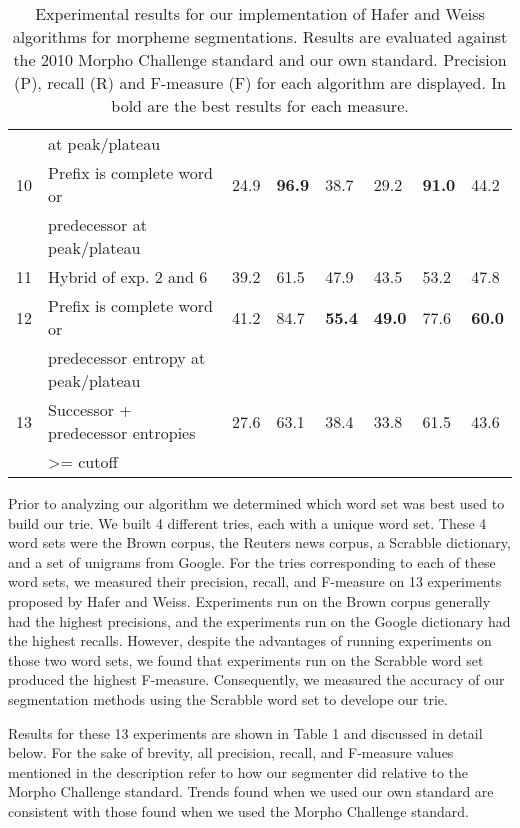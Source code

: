 \documentclass[11pt,letterpaper]{article}
\begin{document}
\begin{table*}[t]
\begin{tabular}{|l|l|l|l|l|l|l|l|}
 & at peak/plateau &  &  &  &  &  &  \\
10 & Prefix is complete word or & 24.9 & \textbf{96.9} & 38.7 & 29.2 & \textbf{91.0} & 44.2 \\
 & predecessor at peak/plateau &  &  &  &  &  &  \\
11 & Hybrid of exp. 2 and 6 & 39.2 & 61.5 & 47.9 & 43.5 & 53.2 & 47.8 \\
12 & Prefix is complete word or & 41.2 & 84.7 & \textbf{55.4} & \textbf{49.0} & 77.6 & \textbf{60.0} \\
 & predecessor entropy at peak/plateau &  &  &  &  &  &  \\
13 & Successor + predecessor entropies & 27.6 & 63.1 & 38.4 & 33.8 & 61.5 & 43.6 \\
 & \textgreater= cutoff &  &  &  &  &  &  \\ \hline
\end{tabular}
\caption{\label{tab:widgets}Experimental results for our implementation of Hafer and Weiss algorithms for morpheme segmentations. Results are evaluated against the 2010 Morpho Challenge standard and our own standard. Precision (P), recall (R) and F-measure (F) for each algorithm are displayed. In bold are the best results for each measure.}
\end{table*}

Prior to analyzing our algorithm we determined which word set was best used to build our trie. We built 4 different tries, each with a unique word set. These 4 word sets were the Brown corpus, the Reuters news corpus, a Scrabble dictionary, and a set of unigrams from Google. For the tries corresponding to each of these word sets, we measured their precision, recall, and F-measure on 13 experiments proposed by Hafer and Weiss. Experiments run on the Brown corpus generally had the highest precisions, and the experiments run on the Google dictionary had the highest recalls. However, despite the advantages of running experiments on those two word sets, we found that experiments run on the Scrabble word set produced the highest F-measure. Consequently, we measured the accuracy of our segmentation methods using the Scrabble word set to develope our trie.

Results for these 13 experiments are shown in Table 1 and discussed in detail below. For the sake of brevity, all precision, recall, and F-measure values mentioned in the description refer to how our segmenter did relative to the Morpho Challenge standard. Trends found when we used our own standard are consistent with those found when we used the Morpho Challenge standard.
\end{document}

